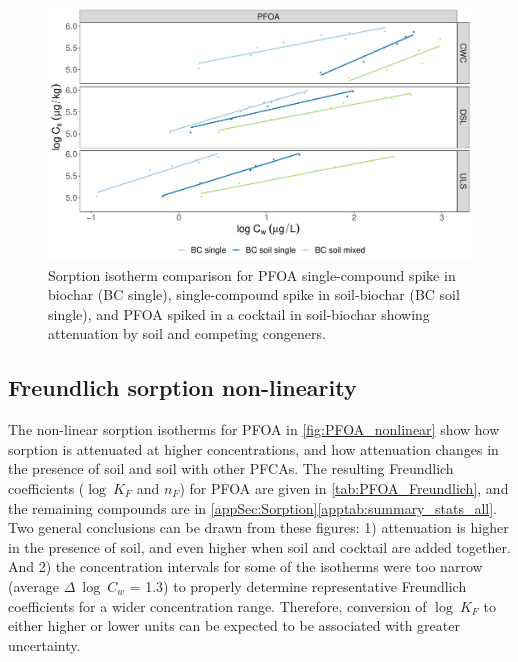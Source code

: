 \begin{figure}[htb]
    \centering
    \includegraphics[width=\textwidth]{R/figs/Attenuation_isotherms_PFOA.pdf}
    \caption{Sorption isotherm comparison for PFOA single-compound spike in biochar (BC single), single-compound spike in soil-biochar (BC soil single), and PFOA spiked in a cocktail in soil-biochar showing attenuation by soil and competing congeners.}
    \label{fig:PFOA_attenuation}
\end{figure}

\subsection{Freundlich sorption non-linearity}\label{sec:non-linearity}
The non-linear sorption isotherms for PFOA in \cref{fig:PFOA_nonlinear} show how sorption is attenuated at higher concentrations, and how attenuation changes in the presence of soil and soil with other PFCAs. The resulting Freundlich coefficients ($\log~K_F$ and $n_F$) for PFOA are given in \cref{tab:PFOA_Freundlich}, and the remaining compounds are in \cref{appSec:Sorption}\cref{apptab:summary_stats_all}. Two general conclusions can be drawn from these figures: 1) attenuation is higher in the presence of soil, and even higher when soil and cocktail are added together. And 2) the concentration intervals for some of the isotherms were too narrow (average $\Delta~\log~C_w$ = 1.3) to properly determine representative Freundlich coefficients for a wider concentration range. Therefore, conversion of $\log~K_F$ to either higher or lower units can be expected to be associated with greater uncertainty.

